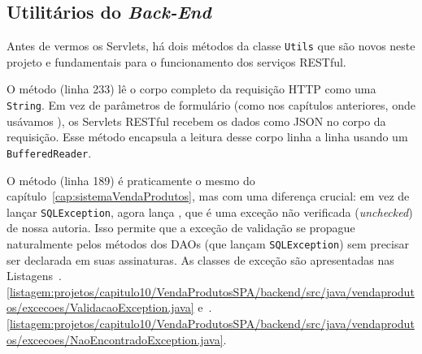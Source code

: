 \subsection{Utilitários do \textit{Back-End}}

Antes de vermos os Servlets, há dois métodos da classe \texttt{Utils} que são novos neste projeto e fundamentais para o funcionamento dos serviços RESTful.


O método  (linha 233) lê o corpo completo da requisição HTTP como uma \texttt{String}. Em vez de parâmetros de formulário (como nos capítulos anteriores, onde usávamos ), os Servlets RESTful recebem os dados como JSON no corpo da requisição. Esse método encapsula a leitura desse corpo linha a linha usando um \texttt{BufferedReader}.

O método  (linha 189) é praticamente o mesmo do capítulo~\ref{cap:sistemaVendaProdutos}, mas com uma diferença crucial: em vez de lançar \texttt{SQLException}, agora lança , que é uma exceção não verificada (\textit{unchecked}) de nossa autoria. Isso permite que a exceção de validação se propague naturalmente pelos métodos dos DAOs (que lançam \texttt{SQLException}) sem precisar ser declarada em suas assinaturas. As classes de exceção são apresentadas nas Listagens~\thechapter.\ref{listagem:projetos/capitulo10/VendaProdutosSPA/backend/src/java/vendaprodutos/excecoes/ValidacaoException.java} e~\thechapter.\ref{listagem:projetos/capitulo10/VendaProdutosSPA/backend/src/java/vendaprodutos/excecoes/NaoEncontradoException.java}.



